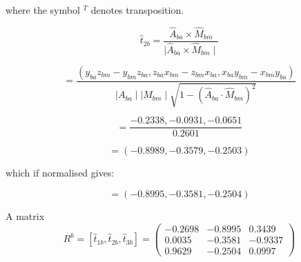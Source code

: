 where the symbol $^{T}$ denotes transposition.

\begin{equation}\label{eq:T2bapp}
\hat{t}_{2b} = \frac{\hat{A}_{ba} \times \hat{M}_{bm}}{\mid \hat{A}_{ba} \times \hat{M}_{bm} \mid} 
\end{equation}  

\[
= \frac{(y_{ba} z_{bm} - y_{bm} z_{ba}, z_{ba} x_{bm} - z_{bm} x_{ba}, x_{ba} y_{bm} - x_{bm} y_{ba} )}{\mid A_{ba} \mid \mid M_{bm} \mid \sqrt{1 - (\hat{A}_{ba} \cdot \hat{M}_{bm})^{2}  }}
\]


\[
= \frac{-0.2338, -0.0931, -0.0651}{ 0.2601}
\]

\[
= (-0.8989, -0.3579, -0.2503)
\]
 
 which if normalised gives:
 
 \[
= (-0.8995, -0.3581, -0.2504)
\]


\vspace{10mm}
A matrix
\[
 R^{b} = [\hat{t}_{1b}, \hat{t}_{2b}, \hat{t}_{3b}] = 
 \begin{pmatrix}
  -0.2698 & -0.8995 & 0.3439 \\
  0.0035 & -0.3581 & -0.9337 \\
  0.9629 & -0.2504 & 0.0997
 \end{pmatrix}
\]





